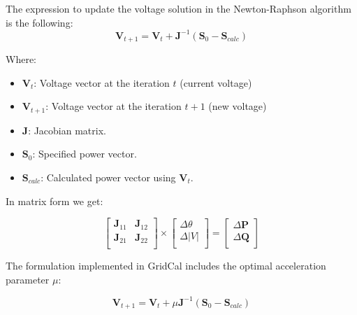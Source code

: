 \documentclass[11pt,fleqn]{book} %
\begin{document}
The expression to update the voltage solution in the Newton-Raphson algorithm is the following:
\begin{equation}
\textbf{V}_{t+1} = \textbf{V}_t + \textbf{J}^{-1}(\textbf{S}_0 - \textbf{S}_{calc})
\end{equation}

Where:
\begin{itemize}
	\item $\textbf{V}_t$: Voltage vector at the iteration $t$  (current voltage) 
	\item $\textbf{V}_{t+1}$: Voltage vector at the iteration $t+1$  (new voltage)
	\item $\textbf{J}$: Jacobian matrix.
	\item $\textbf{S}_0$: Specified power vector.
	\item $\textbf{S}_{calc}$: Calculated power vector using $\textbf{V}_t$.\newline
\end{itemize}

In matrix form we get:


\begin{equation}
\begin{bmatrix}
\textbf{J}_{11} & \textbf{J}_{12} \\
\textbf{J}_{21} & \textbf{J}_{22} \\
\end{bmatrix}
\times
\begin{bmatrix}
\Delta\theta\\
\Delta|V|\\
\end{bmatrix}
=
\begin{bmatrix}
\Delta \textbf{P}\\
\Delta \textbf{Q}\\
\end{bmatrix}
\end{equation}



The formulation implemented in GridCal includes the optimal acceleration parameter $\mu$:

\begin{equation}
\textbf{V}_{t+1} = \textbf{V}_t + \mu \textbf{J}^{-1}(\textbf{S}_0 - \textbf{S}_{calc})
\end{equation}
\end{document}

